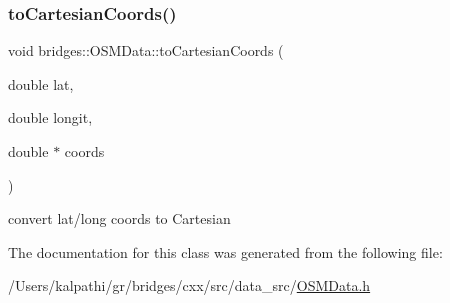 \subsubsection{\texorpdfstring{toCartesianCoords()}{toCartesianCoords()}}
{\footnotesize\ttfamily void bridges\+::\+O\+S\+M\+Data\+::to\+Cartesian\+Coords (\begin{DoxyParamCaption}\item[{double}]{lat,  }\item[{double}]{longit,  }\item[{double $\ast$}]{coords }\end{DoxyParamCaption})\hspace{0.3cm}{\ttfamily [inline]}}

convert lat/long coords to Cartesian 

The documentation for this class was generated from the following file\+:\begin{DoxyCompactItemize}
\item 
/\+Users/kalpathi/gr/bridges/cxx/src/data\+\_\+src/\mbox{\hyperlink{_o_s_m_data_8h}{O\+S\+M\+Data.\+h}}\end{DoxyCompactItemize}
